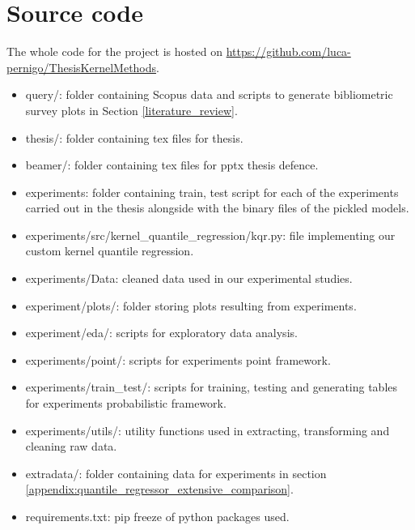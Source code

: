 \section{Source code}\label{src_code}
The whole code for the project is hosted on
\url{https://github.com/luca-pernigo/ThesisKernelMethods}\label{github_repo}.
\\
\begin{itemize}
    \item query/: folder containing Scopus data and scripts to generate bibliometric survey plots in Section \ref{literature_review}.
    \item thesis/: folder containing tex files for thesis.
    \item beamer/: folder containing tex files for pptx thesis defence.
    \item experiments: folder containing train, test script for each of the experiments carried out in the thesis alongside with the binary files of the pickled models.
    \item experiments/src/kernel\_quantile\_regression/kqr.py: file implementing our custom kernel quantile regression.
    \item experiments/Data: cleaned data used in our experimental studies.
    \item experiment/plots/: folder storing plots resulting from experiments.
    \item experiment/eda/: scripts for exploratory data analysis.
    \item experiments/point/: scripts for experiments point framework.
    \item experiments/train\_test/: scripts for training, testing and generating tables for experiments probabilistic framework.
    \item experiments/utils/: utility functions used in extracting, transforming and cleaning raw data.
    \item extradata/: folder containing data for experiments in section \ref{appendix:quantile_regressor_extensive_comparison}.
    \item requirements.txt: pip freeze of python packages used.
\end{itemize}
